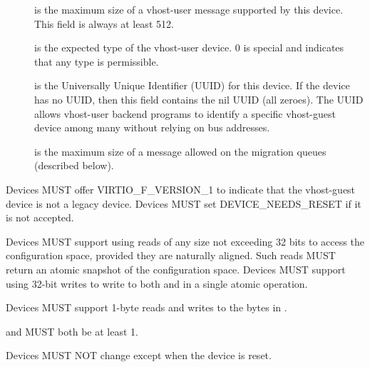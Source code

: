 \begin{description}
\item[] is the maximum size of a
    vhost-user message supported by this device. This field is
    always at least 512.

\item[] is the expected type of
    the vhost-user device. 0 is special and indicates that any
    type is permissible.

\item[] is the Universally Unique Identifier (UUID)
    for this device. If the device has no UUID, then this
    field contains the nil UUID (all zeroes). The UUID
    allows vhost-user backend programs to identify a specific
    vhost-guest device among many without relying on bus
    addresses.

\item[] is the maximum size of
    a message allowed on the migration queues (described below).

\end{description}


Devices MUST offer VIRTIO_F_VERSION_1 to indicate that the
vhost-guest device is not a legacy device. Devices MUST set
DEVICE_NEEDS_RESET if it is not accepted.

Devices MUST support using reads of any size not exceeding 32
bits to access the configuration space, provided they are
naturally aligned. Such reads MUST return an atomic snapshot of
the configuration space. Devices MUST support using 32-bit
writes to write to both  and
 in a single atomic operation.

Devices MUST support 1-byte reads and writes to the bytes in
.

 and
 MUST both be at least 1.

Devices MUST NOT change  except when the device is
reset.



